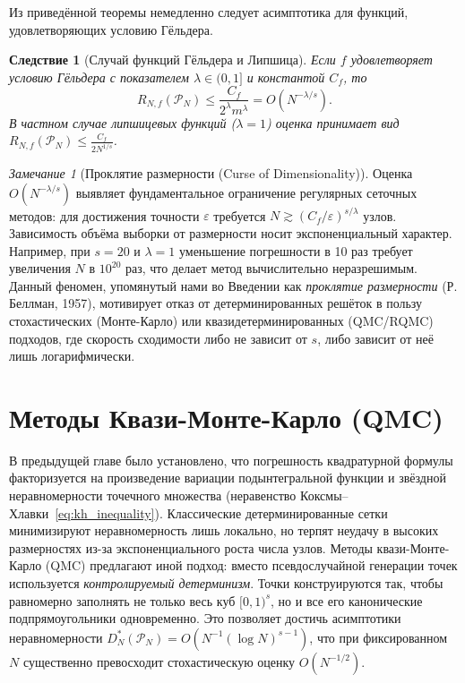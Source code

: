\documentclass[12pt, a4paper]{article}
\theoremstyle{plain}
\newtheorem{corollary}[theorem]{Следствие}
\theoremstyle{definition}
\theoremstyle{remark}
\newtheorem{remark}[theorem]{Замечание}
\newcommand{\II}{[0, 1)}
\newcommand{\PP}{\mathcal{P}}
\begin{document}
Из приведённой теоремы немедленно следует асимптотика для функций, удовлетворяющих условию Гёльдера.

\begin{corollary}[Случай функций Гёльдера и Липшица]
    Если $f$ удовлетворяет условию Гёльдера с показателем $\lambda \in (0,1]$ и константой $C_f$, то
    \begin{equation}
        R_{N,f}(\PP_N) \le \frac{C_f}{2^\lambda m^\lambda} = O(N^{-\lambda/s}).
    \end{equation}
    В частном случае липшицевых функций ($\lambda = 1$) оценка принимает вид $R_{N,f}(\PP_N) \le \frac{C_f}{2 N^{1/s}}$.
\end{corollary}

\begin{remark}[Проклятие размерности (Curse of Dimensionality)]
    Оценка $O(N^{-\lambda/s})$ выявляет фундаментальное ограничение регулярных сеточных методов: для достижения точности $\varepsilon$ требуется $N \gtrsim (C_f / \varepsilon)^{s/\lambda}$ узлов. Зависимость объёма выборки от размерности носит экспоненциальный характер. Например, при $s=20$ и $\lambda=1$ уменьшение погрешности в 10 раз требует увеличения $N$ в $10^{20}$ раз, что делает метод вычислительно неразрешимым. Данный феномен, упомянутый нами во Введении как \textit{проклятие размерности} (Р. Беллман, 1957), мотивирует отказ от детерминированных решёток в пользу стохастических (Монте-Карло) или квазидетерминированных (QMC/RQMC) подходов, где скорость сходимости либо не зависит от $s$, либо зависит от неё лишь логарифмически.
\end{remark}

\section{Методы Квази-Монте-Карло (QMC)}
\label{sec:qmc}

В предыдущей главе было установлено, что погрешность квадратурной формулы факторизуется на произведение вариации подынтегральной функции и звёздной неравномерности точечного множества (неравенство Коксмы--Хлавки~\eqref{eq:kh_inequality}). Классические детерминированные сетки минимизируют неравномерность лишь локально, но терпят неудачу в высоких размерностях из-за экспоненциального роста числа узлов. Методы квази-Монте-Карло (QMC) предлагают иной подход: вместо псевдослучайной генерации точек используется \textit{контролируемый детерминизм}. Точки конструируются так, чтобы равномерно заполнять не только весь куб $\II^s$, но и все его канонические подпрямоугольники одновременно. Это позволяет достичь асимптотики неравномерности $D_N^*(\PP_N) = O(N^{-1}(\log N)^{s-1})$, что при фиксированном $N$ существенно превосходит стохастическую оценку $O(N^{-1/2})$.
\end{document}
